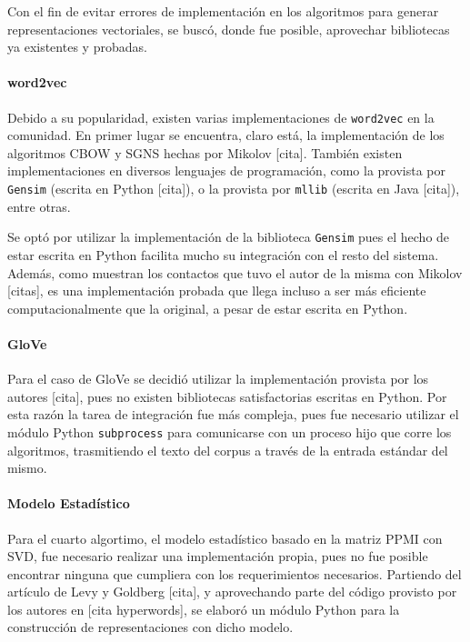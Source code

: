 Con el fin de evitar errores de implementación en los algoritmos para generar representaciones
vectoriales, se buscó, donde fue posible, aprovechar bibliotecas ya existentes y probadas.

\paragraph{word2vec}

Debido a su popularidad, existen varias implementaciones de \texttt{word2vec} en la comunidad. En
primer lugar se encuentra, claro está, la implementación de los algoritmos CBOW y SGNS hechas por
Mikolov [cita]. También existen implementaciones en diversos lenguajes de programación, como la
provista por \texttt{Gensim} (escrita en Python [cita]), o la provista por \texttt{mllib} (escrita
en Java [cita]), entre otras.

Se optó por utilizar la implementación de la biblioteca \texttt{Gensim} pues el hecho de estar
escrita en Python facilita mucho su integración con el resto del sistema. Además, como muestran los
contactos que tuvo el autor de la misma con Mikolov [citas], es una implementación probada que llega
incluso a ser más eficiente computacionalmente que la original, a pesar de estar escrita en Python.


\paragraph{GloVe}

Para el caso de GloVe se decidió utilizar la implementación provista por los autores [cita], pues no
existen bibliotecas satisfactorias escritas en Python. Por esta razón la tarea de integración fue
más compleja, pues fue necesario utilizar el módulo Python \texttt{subprocess} para comunicarse con
un proceso hijo que corre los algoritmos, trasmitiendo el texto del corpus a través de la entrada
estándar del mismo.


\paragraph{Modelo Estadístico}

Para el cuarto algortimo, el modelo estadístico basado en la matriz PPMI con SVD, fue necesario
realizar una implementación propia, pues no fue posible encontrar ninguna que cumpliera con los
requerimientos necesarios. Partiendo del artículo de Levy y Goldberg [cita], y aprovechando parte
del código provisto por los autores en [cita hyperwords], se elaboró un módulo Python para la
construcción de representaciones con dicho modelo.

